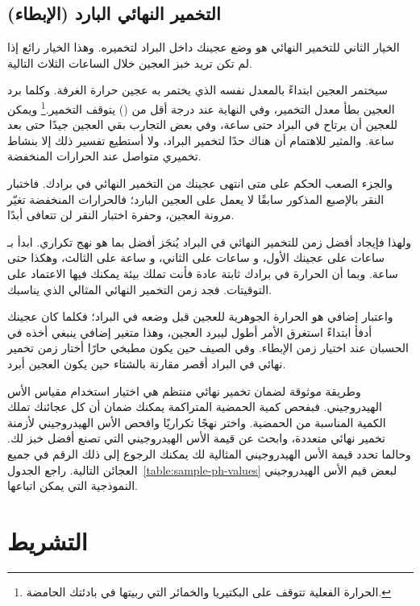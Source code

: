 \subsection{التخمير النهائي البارد \textenglish{(}الإبطاء\textenglish{)}}

الخيار الثاني للتخمير النهائي هو وضع عجينك داخل البراد لتخميره. وهذا الخيار رائع إذا لم تكن تريد خبز العجين خلال الساعات الثلاث التالية.

سيختمر العجين ابتداءً بالمعدل نفسه الذي يختمر به عجين حرارة الغرفة. وكلما برد العجين بطأ معدل التخمير، وفي النهاية عند درجة أقل من  () يتوقف التخمير.\footnote{الحرارة الفعلية تتوقف على البكتيريا والخمائر التي ربيتها في بادئتك الحامضة.} ويمكن للعجين أن يرتاح في البراد حتى  ساعة، وفي بعض التجارب بقي العجين جيدًا حتى بعد  ساعة. والمثير للاهتمام أن هناك حدًا لتخمير البراد، ولا أستطيع تفسير ذلك إلا بنشاط تخميري متواصل عند الحرارات المنخفضة.

والجزء الصعب الحكم على متى انتهى عجينك من التخمير النهائي في برادك. فاختبار النقر بالإصبع المذكور سابقًا لا يعمل على العجين البارد؛ فالحرارات المنخفضة تغيّر مرونة العجين، وحفرة اختبار النقر لن تتعافى أبدًا.

ولهذا فإيجاد أفضل زمن للتخمير النهائي في البراد يُنجَز أفضل بما هو نهج تكراري. ابدأ بـ ساعات على عجينك الأول، و ساعات على الثاني، و ساعة على الثالث، وهكذا حتى  ساعة. وبما أن الحرارة في برادك ثابتة عادة فأنت تملك بيئة يمكنك فيها الاعتماد على التوقيتات. فجد زمن التخمير النهائي المثالي الذي يناسبك.

واعتبار إضافي هو الحرارة الجوهرية للعجين قبل وضعه في البراد؛ فكلما كان عجينك أدفأ ابتداءً استغرق الأمر أطول ليبرد العجين، وهذا متغير إضافي ينبغي أخذه في الحسبان عند اختيار زمن الإبطاء. وفي الصيف حين يكون مطبخي حارًا أختار زمن تخمير نهائي في البراد أقصر مقارنة بالشتاء حين يكون العجين أبرد.

وطريقة موثوقة لضمان تخمير نهائي منتظم هي اختيار استخدام مقياس الأس الهيدروجيني. فبفحص كمية الحمضية المتراكمة يمكنك ضمان أن كل عجائنك تملك الكمية المناسبة من الحمضية. واختر نهجًا تكراريًا وافحص الأس الهيدروجيني لأزمنة تخمير نهائي متعددة، وابحث عن قيمة الأس الهيدروجيني التي تصنع أفضل خبز لك. وحالما تحدد قيمة الأس الهيدروجيني المثالية لك يمكنك الرجوع إلى ذلك الرقم في جميع العجائن التالية. راجع الجدول~\ref{table:sample-ph-values} لبعض قيم الأس الهيدروجيني النموذجية التي يمكن اتباعها.

\section{التشريط}

